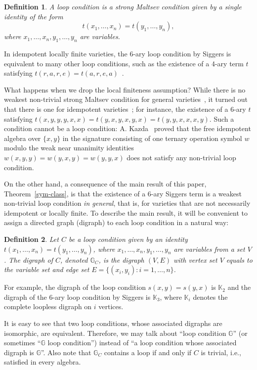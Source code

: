 \documentclass[a4paper]{article}
\newcommand{\lc}[1]{#1}
\newcommand{\relstr}[1]{\mathbb{#1}}
\newtheorem{definition}{Definition}
\begin{document}
\begin{definition}
A \emph{loop condition} is a strong Maltsev condition given by a single identity of the form $$t(x_1, \dots, x_n) = t(y_1, \dots, y_n),$$
where $x_1, \dots, x_n, y_1, \dots, y_n$ are variables.
\end{definition}

In idempotent locally finite varieties, the 6-ary loop condition by Siggers is equivalent to many other loop conditions, such as the existence of a 4-ary term $t$ satisfying $t(r,a,r,e) = t(a,r,e,a)$~\cite{OptimalStrong}. 


What happens when we drop the local finiteness assumption?
While there is no weakest non-trivial strong Maltsev condition for general varieties~\cite{Taylor88,Noncovering}, it turned out that there is one for idempotent varieties~\cite{Olsak}; for instance, the existence of a $6$-ary $t$ satisfying $t(x,y,y,y,x,x)=t(y,x,y,x,y,x)=t(y,y,x,x,x,y)$.
Such a condition cannot be a loop condition: A. Kazda~\cite{Kazda} proved that the free idempotent algebra over $\{x,y\}$ in the signature consisting of one ternary operation symbol $w$ modulo the weak near unanimity identities $w(x,y,y)=w(y,x,y)=w(y,y,x)$ does not satisfy any non-trivial loop condition. 

On the other hand, a consequence of the main result of this paper, Theorem~\ref{sym-class}, is that the existence of a 6-ary Siggers term is a weakest non-trivial loop condition \emph{in general}, that is, for varieties that are not necessarily idempotent or locally finite. To describe the main result, it will be convenient to assign a directed graph (digraph) to each loop condition in a natural way:

\begin{definition}
  \label{GC-def}
  Let $\lc C$ be a loop condition given by an identity
  $t(x_1, \dots, x_n)=t(y_1, \dots, y_n)$, where
  $x_1, \dots, x_n, y_1, \dots, y_n$ are variables from a set $V$.
  The \emph{digraph of $\lc C$}, denoted $\relstr G_{\lc C}$, is the
  digraph $(V,E)$ with vertex set $V$ equals to the variable set and edge
  set $E=\{(x_i, y_i): i=1, \dots, n\}$.
\end{definition}

For example, the digraph of the loop condition $s(x,y)=s(y,x)$ is $\relstr{K}_2$ and 
the digraph of the $6$-ary loop condition by Siggers is $\relstr{K}_3$, where $\relstr{K}_i$ denotes the complete loopless digraph on $i$ vertices.

It is easy to see that two loop conditions, whose associated digraphs are isomorphic, are equivalent. Therefore, we may talk about ``loop condition $\relstr{G}$'' (or sometimes ``$\relstr{G}$ loop condition'') instead of ``a loop condition whose associated digraph is $\relstr{G}$''.  Also note that $\relstr{G}_{\lc C}$ contains a loop if and only if $\lc C$ is trivial, i.e., satisfied in every algebra.
\end{document}
